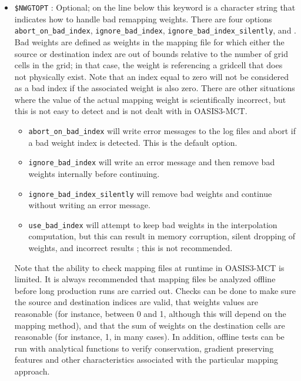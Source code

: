 \begin{itemize}
\item {\tt \$NWGTOPT} : Optional; on the line below this keyword is a character string
  that indicates how to handle bad remapping weights.  There are four options \newline
  {\tt abort\_on\_bad\_index}, {\tt ignore\_bad\_index}, {\tt ignore\_bad\_index\_silently}, and
 .  Bad weights are defined as weights in the mapping file for which either
  the source or destination index are out of bounds relative to the number of grid cells
  in the grid; in that case, the weight is referencing a gridcell that does not physically
  exist.  Note that an index equal to zero will not be considered as a bad index if the associated weight
  is also zero. There are other situations where the value of the actual mapping weight is
  scientifically incorrect, but this is not easy to detect and is not dealt with in OASIS3-MCT.
  \begin{itemize}
  \item {\tt abort\_on\_bad\_index} will write error messages to the log files and abort if a bad weight
  index is detected. This is the default option.
  \item {\tt ignore\_bad\_index} will write an error message and then remove bad
  weights internally before continuing.
  \item {\tt ignore\_bad\_index\_silently} will remove bad weights and continue without writing an error
  message.
  \item {\tt use\_bad\_index} will attempt to keep bad weights in the interpolation computation,
  but this can result in memory corruption, silent dropping of weights, and incorrect results ; this is not recommended.
  \end{itemize}

  Note that the ability to check mapping files at runtime in OASIS3-MCT is limited.  It is always
  recommended that mapping files be analyzed offline before long production runs are carried out.
  Checks can be done to make sure the source and destination indices are valid, that weights values
  are reasonable (for instance, between 0 and 1, although this will depend on the mapping method),
  and that the sum of weights on the destination cells are reasonable (for instance, 1, in many cases).
  In addition, offline tests can be run with analytical functions to verify conservation, gradient
  preserving features and other characteristics associated with the particular mapping approach.


\end{itemize}

